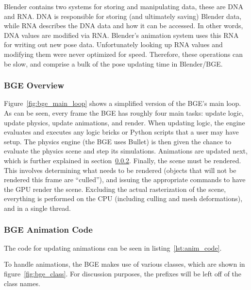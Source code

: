 Blender contains two systems for storing and manipulating data, these are DNA and RNA. DNA is responsible for storing (and ultimately saving) Blender data, while RNA describes the DNA data and how it can be accessed.
In other words, DNA values are modified via RNA.
Blender's animation system uses this RNA for writing out new pose data.
Unfortunately looking up RNA values and modifying them were never optimized for speed.
Therefore, these operations can be slow, and comprise a bulk of the pose updating time in Blender/BGE.

\subsubsection{BGE Overview}
\label{sec:bge_general_overview}


Figure~\ref{fig:bge_main_loop} shows a simplified version of the BGE's main loop.
As can be seen, every frame the BGE has roughly four main tasks: update logic, update physics, update animations, and render.
When updating logic, the engine evaluates and executes any logic bricks or Python scripts that a user may have setup.
The physics engine (the BGE uses Bullet) is then given the chance to evaluate the physics scene and step its simulations.
Animations are updated next, which is further explained in section~\ref{sec:bge_anim_overview}.
Finally, the scene must be rendered.
This involves determining what needs to be rendered (objects that will not be rendered this frame are ``culled''), and issuing the appropriate commands to have the GPU render the scene.
Excluding the actual rasterization of the scene, everything is performed on the CPU (including culling and mesh deformations), and in a single thread.

\subsubsection{BGE Animation Code}
\label{sec:bge_anim_overview}

The code for updating animations can be seen in listing~\ref{lst:anim_code}.


To handle animations, the BGE makes use of various classes, which are shown in figure~\ref{fig:bge_class}.
For discussion purposes, the prefixes will be left off of the class names.

